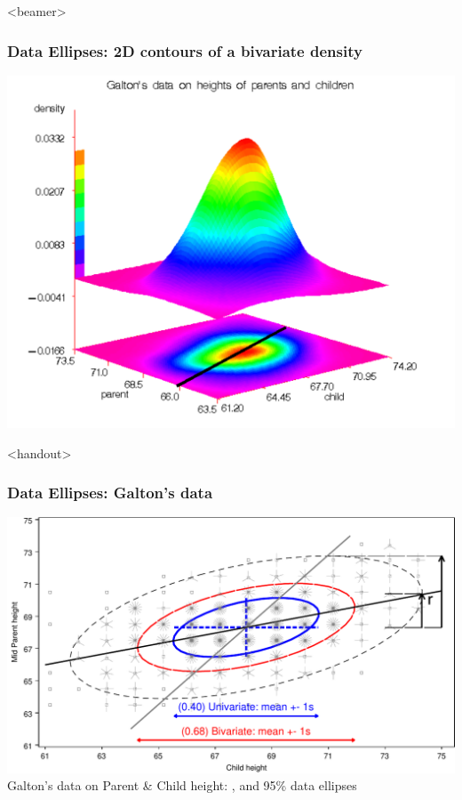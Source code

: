 \renewcommand{\FileName}{dataellipse3}

\begin{frame}<beamer>
  \frametitle{Data Ellipses: 2D contours of a bivariate density}
 \begin{center}
  \includegraphics[height=.8\textheight,clip]{fig/galton-kdes}
 \end{center}
\end{frame}

\begin{frame}<handout>
  \frametitle{Data Ellipses: Galton's data}
  \begin{center}
  \includegraphics[width=.9\textwidth,clip]{fig/galton-reg3}
  \\ Galton's data on Parent \& Child height: ,  and 95\% data ellipses
  \end{center}
\end{frame}

